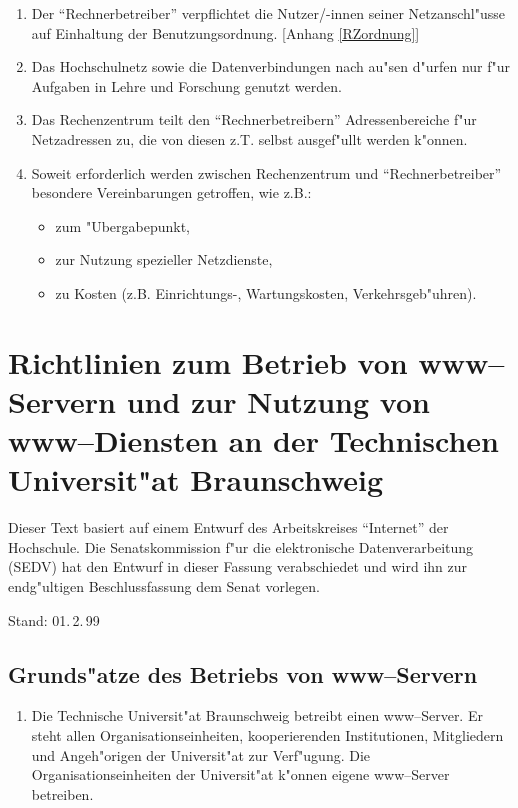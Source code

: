 \documentclass[12pt,titlepage,twoside]{scrartcl}
\begin{document}
\begin{appendix}
\begin{enumerate}
  \item Der "`Rechnerbetreiber"' verpflichtet die Nutzer/-innen seiner
    Netzanschl"usse auf Einhaltung der Benutzungsordnung. [Anhang
    \ref{RZordnung}]

  \item Das Hochschulnetz sowie die Datenverbindungen nach au"sen
    d"urfen nur f"ur Aufgaben in Lehre und Forschung
    genutzt werden.

  \item Das Rechenzentrum teilt den "`Rechnerbetreibern"' Adressenbereiche
    f"ur Netzadressen zu, die von diesen z.T. selbst ausgef"ullt werden k"onnen.

  \item Soweit erforderlich werden zwischen Rechenzentrum und
    "`Rechnerbetreiber"' besondere Vereinbarungen getroffen, wie z.B.:
    \begin{itemize}
      \item zum "Ubergabepunkt,
      \item zur Nutzung spezieller Netzdienste,
      \item zu Kosten (z.B. Einrichtungs-, Wartungskosten,
        Verkehrsgeb"uhren).
    \end{itemize}
\end{enumerate}

\clearpage

\section[WWW-Richtlinien an der TU Braunschweig]{Richtlinien zum Betrieb von
  www--Servern und zur Nutzung von www--Diensten an der Technischen
  Universit"at Braunschweig}
\label{www-Richtlinien}

{\small Dieser Text basiert auf einem Entwurf des Arbeitskreises "`Internet"'
  der Hochschule. Die Senatskommission f"ur die elektronische Datenverarbeitung
  (SEDV) hat den Entwurf in dieser Fassung verabschiedet und wird ihn zur
  endg"ultigen Beschlussfassung dem Senat vorlegen.

  Stand: 01.\,2.\,99}

\subsection{Grunds"atze des Betriebs von www--Servern}

\begin{enumerate}
  \item Die Technische Universit"at Braunschweig betreibt einen
        www--Server. Er steht allen Organisationseinheiten, kooperierenden
        Institutionen, Mitgliedern und Angeh"origen der
        Universit"at zur Verf"ugung. Die Organisationseinheiten
        der Universit"at k"onnen eigene www--Server betreiben.


\end{enumerate}
\end{appendix}
\end{document}
